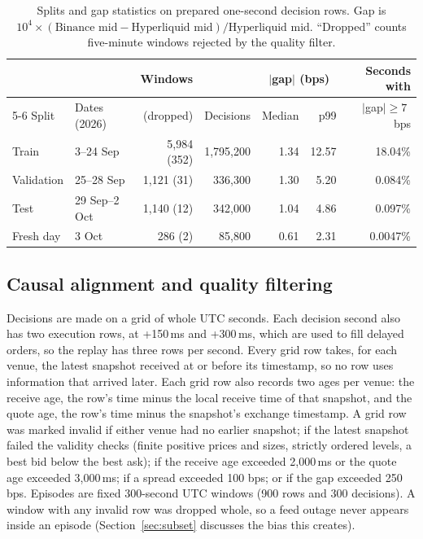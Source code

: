 \documentclass[12pt,a4paper]{article}
\DeclareRobustCommand{\bps}{\ifmmode\,\text{bps}\else\,bps\fi}
\begin{document}
\begin{table}[!htbp]
\centering
\caption{Splits and gap statistics on prepared one-second decision rows. Gap is
$10^4\times(\text{Binance mid} - \text{Hyperliquid mid})/\text{Hyperliquid mid}$.
``Dropped'' counts five-minute windows rejected by the quality filter.}
\label{tab:data}
\begin{tabular}{@{}llrrrrr@{}}
\toprule
 & & Windows & & \multicolumn{2}{c}{$|$gap$|$ (bps)} & Seconds with \\
\cmidrule(lr){5-6}
Split & Dates (2026) & (dropped) & Decisions & Median & p99 & $|$gap$|\geq 7$\bps{} \\
\midrule
Train      & 3--24 Sep   & 5,984 (352) & 1,795,200 & 1.34 & 12.57 & 18.04\% \\
Validation & 25--28 Sep  & 1,121 (31)  &   336,300 & 1.30 &  5.20 & 0.084\% \\
Test       & 29 Sep--2 Oct & 1,140 (12) &  342,000 & 1.04 &  4.86 & 0.097\% \\
Fresh day  & 3 Oct       &   286 (2)   &    85,800 & 0.61 &  2.31 & 0.0047\% \\
\bottomrule
\end{tabular}
\end{table}

\subsection{Causal alignment and quality filtering}\label{sec:align}
Decisions are made on a grid of whole UTC seconds. Each decision second also has two
execution rows, at +150\,ms and +300\,ms, which are used to fill delayed orders, so the
replay has three rows per second. Every grid row takes, for each venue, the latest snapshot
received at or before its timestamp, so no row uses information that arrived later. Each
grid row also records two ages per venue: the receive age, the row's time minus the local
receive time of that snapshot, and the quote age, the row's time minus the snapshot's
exchange timestamp. A grid row was marked invalid if either venue had no earlier snapshot; if
the latest snapshot failed the validity checks (finite positive prices and sizes, strictly
ordered levels, a best bid below the best ask); if the receive age exceeded 2,000\,ms or the
quote age exceeded 3,000\,ms; if a spread exceeded 100\bps; or if the gap exceeded 250\bps.
Episodes are fixed 300-second UTC windows (900 rows and 300 decisions). A window with any
invalid row was dropped whole, so a feed outage never appears inside an episode
(Section~\ref{sec:subset} discusses the bias this creates).
\end{document}
